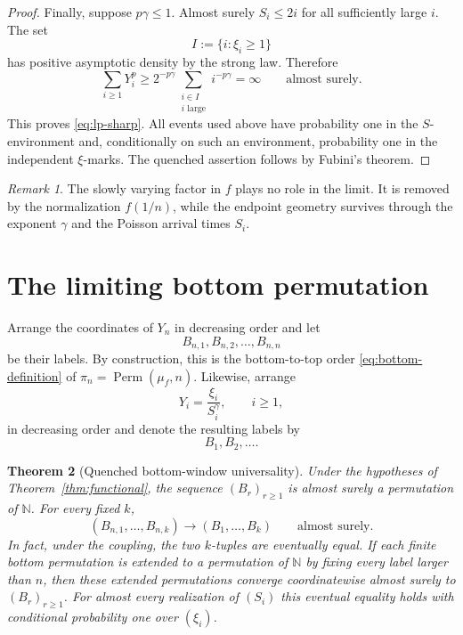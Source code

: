 \documentclass[11pt]{article}
\numberwithin{equation}{section}
\newtheorem{theorem}{Theorem}[section]
\theoremstyle{definition}
\theoremstyle{remark}
\newtheorem{remark}[theorem]{Remark}
\newcommand{\N}{\mathbb N}
\newcommand{\Perm}{\operatorname{Perm}}
\begin{document}
\begin{proof}
Finally, suppose $p\gamma\leq1$.  Almost surely $S_i\leq2i$ for all sufficiently large $i$.  The set
\[
  I:=\{i:\xi_i\geq1\}
\]
has positive asymptotic density by the strong law.  Therefore
\[
  \sum_{i\geq1}Y_i^p
  \geq 2^{-p\gamma}\sum_{\substack{i\in I\\ i\text{ large}}}i^{-p\gamma}
  =\infty
  \qquad\text{almost surely}.
\]
This proves \eqref{eq:lp-sharp}.  All events used above have probability one in the $S$-environment and, conditionally on such an environment, probability one in the independent $\xi$-marks.  The quenched assertion follows by Fubini's theorem.
\end{proof}

\begin{remark}
The slowly varying factor in $f$ plays no role in the limit.  It is removed by the normalization $f(1/n)$, while the endpoint geometry survives through the exponent $\gamma$ and the Poisson arrival times $S_i$.
\end{remark}

\section{The limiting bottom permutation}
\label{sec:bottom}

Arrange the coordinates of $Y_n$ in decreasing order and let
\[
  B_{n,1},B_{n,2},\ldots,B_{n,n}
\]
be their labels.  By construction, this is the bottom-to-top order \eqref{eq:bottom-definition} of $\pi_n=\Perm(\mu_f,n)$.  Likewise, arrange
\[
  Y_i=\frac{\xi_i}{S_i^\gamma},\qquad i\geq1,
\]
in decreasing order and denote the resulting labels by
\[
  B_1,B_2,\ldots.
\]

\begin{theorem}[Quenched bottom-window universality]
\label{thm:bottom-window}
Under the hypotheses of Theorem~\ref{thm:functional}, the sequence $(B_r)_{r\geq1}$ is almost surely a permutation of $\N$.  For every fixed $k$,
\begin{equation}
  (B_{n,1},\ldots,B_{n,k})
  \longrightarrow
  (B_1,\ldots,B_k)
  \qquad\text{almost surely}.
  \label{eq:bottom-window-as}
\end{equation}
In fact, under the coupling, the two $k$-tuples are eventually equal.  If each finite bottom permutation is extended to a permutation of $\N$ by fixing every label larger than $n$, then these extended permutations converge coordinatewise almost surely to $(B_r)_{r\geq1}$.  For almost every realization of $(S_i)$ this eventual equality holds with conditional probability one over $(\xi_i)$.
\end{theorem}
\end{document}
